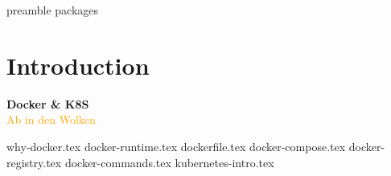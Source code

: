 \RequirePackage{import}
{preamble}
{packages}


\section{Introduction}\label{sec:introduction}

\begin{frame}[c]
    \centering
    \Huge
    \textbf{Docker \& K8S}
    \\
    \vspace{1ex}
    \Large
    \textcolor{orange}{Ab in den Wolken}
\end{frame}
{why-docker.tex}
{docker-runtime.tex}
{dockerfile.tex}
{docker-compose.tex}
{docker-registry.tex}
{docker-commands.tex}
{kubernetes-intro.tex}



